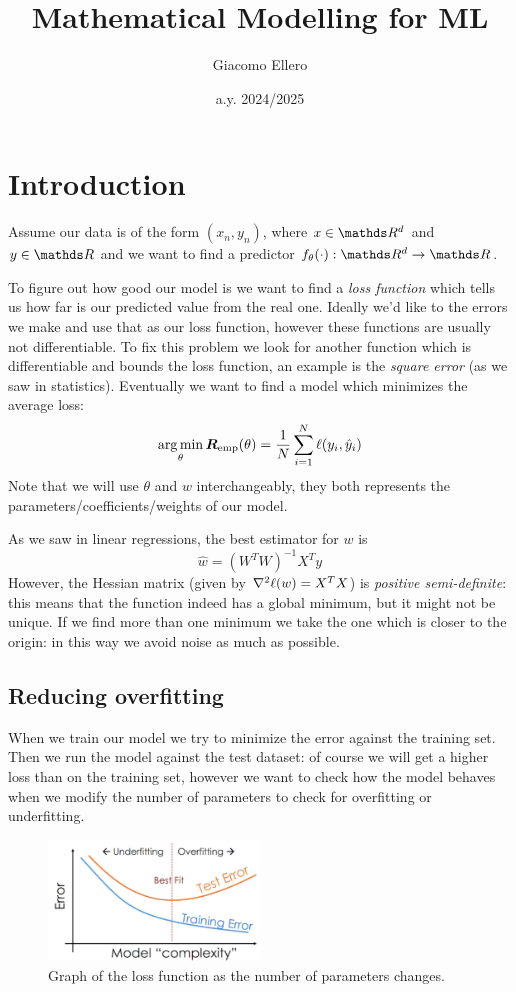 \documentclass[12pt]{extarticle}
\title{Mathematical Modelling for ML}
\author{Giacomo Ellero}
\date{a.y. 2024/2025}
\begin{document}
\oldfirstpage

\section{Introduction}

Assume our data is of the form $(x_n, y_n)$, where $x \in \R ^d$ and $y \in \R$
and we want to find a predictor $f_\theta(\cdot): \R^d \to \R$.

To figure out how good our model is we want to find a \emph{loss function} which tells us
how far is our predicted value from the real one.
Ideally we'd like to  the errors we make and use that as our loss function,
however these functions are usually not differentiable.
To fix this problem we look for another function which is differentiable and bounds the 
loss function, an example is the \emph{square error} (as we saw in statistics).
Eventually we want to find a model which minimizes the average loss:
\begin{equation}
	\operatorname*{arg\,min}_\theta \bm R_\text{emp}(\theta) = \frac{1}{N} \sum_{i = 1}^N \ell(y_i, \hat y_i)
\end{equation}
Note that we will use $\theta$ and $w$ interchangeably,
they both represents the parameters/coefficients/weights of our model.

As we saw in linear regressions, the best estimator for $w$ is
\begin{equation}
	\hat w= (W^T W)^{-1} X^T y
\end{equation}
However, the Hessian matrix (given by $\laplacian \ell (w) = X^T X$)
is \emph{positive semi-definite}: this means that the function indeed has a global minimum,
but it might not be unique.
If we find more than one minimum we take the one which is closer to the origin:
in this way we avoid noise as much as possible.

\subsection{Reducing overfitting}
When we train our model we try to minimize the error against the training set.
Then we run the model against the test dataset:
of course we will get a higher loss than on the training set, however we want to check how the model
behaves when we modify the number of parameters to check for overfitting or underfitting.

\begin{figure}[H]
	\centering
	\includegraphics[width=0.5\textwidth]{./assets/modelling-ml/overfitting-vs-underfitting.jpg}
	\caption{Graph of the loss function as the number of parameters changes.}
\end{figure}
\end{document}
